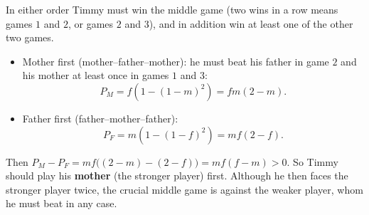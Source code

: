 In either order Timmy must win the middle game (two wins in a row means games $1$ and $2$, or games $2$ and $3$), and in addition win at least one of the other two games.
\begin{itemize}
\item Mother first (mother--father--mother): he must beat his father in game $2$ and his mother at least once in games $1$ and $3$:
\[P_M=f\left(1-(1-m)^2\right)=fm(2-m).\]
\item Father first (father--mother--father):
\[P_F=m\left(1-(1-f)^2\right)=mf(2-f).\]
\end{itemize}
Then $P_M-P_F=mf\big((2-m)-(2-f)\big)=mf(f-m)>0$. So Timmy should play his \textbf{mother} (the stronger player) first. Although he then faces the stronger player twice, the crucial middle game is against the weaker player, whom he must beat in any case.
